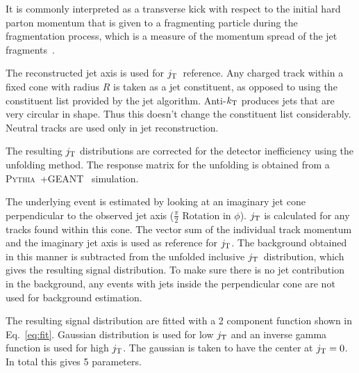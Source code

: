 It is commonly interpreted as a transverse kick with respect to the initial hard parton momentum that is given to a fragmenting particle during the fragmentation process, which is a measure of the momentum spread of the jet fragments~\cite{}.

The reconstructed jet axis is used for $j_{\rm T}$ reference. Any charged track within a fixed cone with radius $R$ is taken as a jet constituent, as opposed to using the constituent list provided by the jet algorithm. Anti-$k_{\rm T}$ produces jets that are very circular in shape. Thus this doesn't change the constituent list considerably. Neutral tracks are used only in jet reconstruction.

The resulting $j_{\rm T}$ distributions are corrected for the detector inefficiency using the unfolding method. The response matrix for the unfolding is obtained from a \textsc{Pythia}~\cite{introPythia81}+GEANT~\cite{Agostinelli:2002hh,Asai:2015xno} simulation.


The underlying event is estimated by looking at an imaginary jet cone perpendicular to the observed jet axis ($\frac{\pi}{2}$ Rotation in $\phi$). $j_{\rm T}$ is calculated for any tracks found within this cone. The vector sum of the individual track momentum and the imaginary jet axis is used as reference for $j_{\rm T}$. The background obtained in this manner is subtracted from the unfolded inclusive $j_{\rm T}$ distribution, which gives the resulting signal distribution. To make sure there is no jet contribution in the background, any events with jets inside the perpendicular cone are not used for background estimation.



The resulting signal distribution are fitted with a 2 component function shown in Eq.~\ref{eq:fit}. Gaussian distribution is used for low $j_{\rm T}$ and an inverse gamma function is used for high $j_{\rm T}$. The gaussian is taken to have the center at $j_{\rm T} = 0$. In total this gives 5 parameters. ~\cite{ALICEjt}

